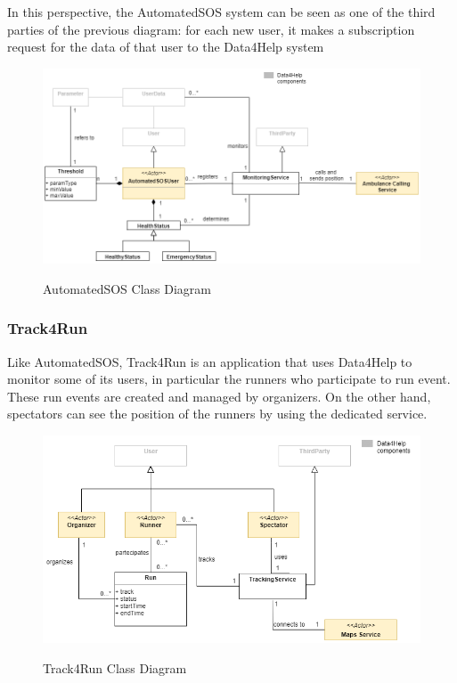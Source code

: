 In this perspective, the AutomatedSOS system can be seen as one of the third parties of the previous diagram: for each new user, it makes a subscription request for the data of that user to the Data4Help system

\begin{figure}[h!]
	\centering
	\includegraphics[width = \linewidth] {../Diagrams/ClassDiagram-AutomatedSOS.png}\\[1.0 cm]
	\caption{AutomatedSOS Class Diagram}
\end{figure}

\newpage
\subsubsection{Track4Run}
Like AutomatedSOS, Track4Run is an application that uses Data4Help to monitor some of its users, in particular the runners who participate to run event.
These run events are created and managed by organizers. On the other hand, spectators can see the position of the runners by using the dedicated service.

\begin{figure}[h!]
	\centering
	\includegraphics[width = \linewidth] {../Diagrams/ClassDiagram-Track4Run.png}\\[1.0 cm]
	\caption{Track4Run Class Diagram}
\end{figure}
	
